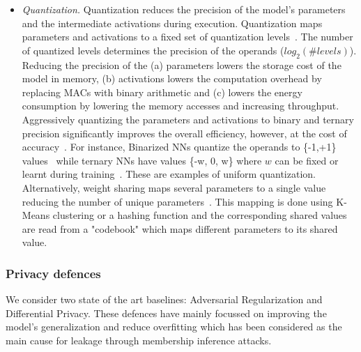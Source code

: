 \begin{itemize}[leftmargin=*]
\item {\em Quantization.}
Quantization reduces the precision of the model's parameters and the intermediate activations during execution.
Quantization maps parameters and activations to a fixed set of quantization levels~\cite{Hubara:2017:QNN:3122009.3242044}.
The number of quantized levels determines the precision of the operands ($log_2(\#levels)$).
Reducing the precision of the (a) parameters lowers the storage cost of the model in memory, (b) activations lowers the computation overhead by replacing MACs with binary arithmetic and (c) lowers the energy consumption by lowering the memory accesses and increasing throughput.
Aggressively quantizing the parameters and activations to binary and ternary precision significantly improves the overall efficiency, however, at the cost of accuracy~\cite{rastegari2016xnornet}.
For instance, Binarized NNs quantize the operands to \{-1,+1\} values~\cite{NIPS2016_6573} while ternary NNs have values \{-w, 0, w\} where $w$ can be fixed or learnt during training~\cite{Li2016TernaryWN}. These are examples of uniform quantization.
Alternatively, weight sharing maps several parameters to a single value reducing the number of unique parameters~\cite{DBLP:journals/corr/HanMD15}.
This mapping is done using K-Means clustering or a hashing function and the corresponding shared values are read from a "codebook" which maps different parameters to its shared value.
\end{itemize}


\subsubsection{Privacy defences}


We consider two state of the art baselines: Adversarial Regularization and Differential Privacy.
These defences have mainly focussed on improving the model's generalization and reduce overfitting which has been considered as the main cause for leakage through membership inference attacks.

